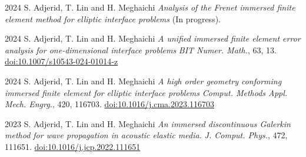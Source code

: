 \documentclass[11pt,letterpaper]{report}
\begin{document}
    \begin{tablist}




        \item[2024]\tab{} S. Adjerid, T. Lin and H. Meghaichi \textit{Analysis of the Frenet immersed finite element method for  elliptic interface problems} (In progress). 
        

        \item[2024] \tab{}S. Adjerid, T. Lin and H. Meghaichi \textit{A unified immersed finite element error analysis for one-dimensional interface problems} \textit{BIT Numer. Math.}, 63, 13.  \href{https://doi.org/10.1007/s10543-024-01014-z}{ 	doi:10.1007/s10543-024-01014-z}


        \item[2024] \tab{}S. Adjerid, T. Lin and H. Meghaichi \textit{A high order geometry conforming immersed finite element for
        elliptic interface problems} \textit{Comput. Methods Appl. Mech. Engrg.}, 420, 116703. \href{https://doi.org/10.1016/j.cma.2023.116703}{doi:10.1016/j.cma.2023.116703} 

        \item[2023] \tab{}S. Adjerid, T. Lin and H. Meghaichi \textit{An immersed discontinuous Galerkin method for wave propagation in acoustic elastic media.} \textit{J. Comput. Phys.}, 472, 111651. \href{https://doi.org/10.1016/j.jcp.2022.111651}{doi:10.1016/j.jcp.2022.111651} 
    \end{tablist}
\end{document}
